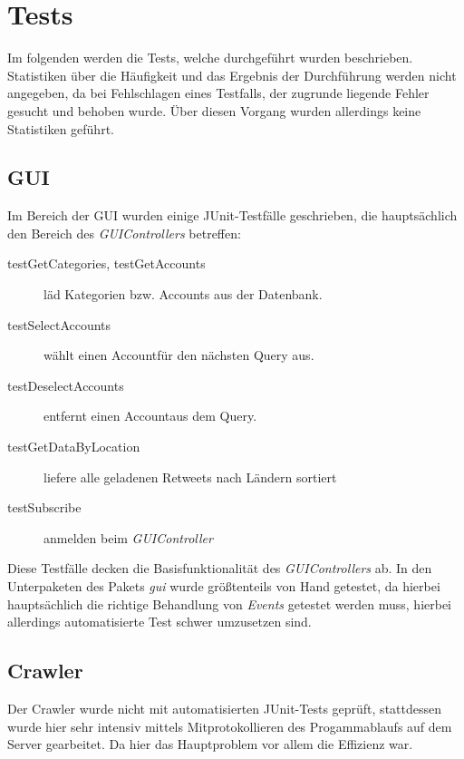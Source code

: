 \section{Tests}

Im folgenden werden die Tests, welche durchgeführt wurden beschrieben. Statistiken über die Häufigkeit und das Ergebnis der Durchführung werden nicht angegeben, da bei Fehlschlagen eines Testfalls, der zugrunde liegende Fehler gesucht und behoben wurde. Über diesen Vorgang wurden allerdings keine Statistiken geführt.

\subsection{GUI}

Im Bereich der GUI wurden einige JUnit-Testfälle geschrieben, die hauptsächlich den Bereich des \emph{GUIControllers} betreffen:
\begin{description}
	\item[testGetCategories, testGetAccounts] läd Kategorien bzw. Accounts aus der Datenbank.
	\item[testSelectAccounts] wählt einen Account\footnotemark[1] für den nächsten Query aus.
	\item[testDeselectAccounts] entfernt einen Account\footnotemark[1] aus dem Query.
	\item[testGetDataByLocation] liefere alle geladenen Retweets nach Ländern sortiert
	\item[testSubscribe] anmelden beim \emph{GUIController}
\end{description}

Diese Testfälle decken die Basisfunktionalität des \emph{GUIControllers} ab. In den Unterpaketen des Pakets \emph{gui} wurde größtenteils von Hand getestet, da  hierbei hauptsächlich die richtige Behandlung von \emph{Events} getestet werden muss, hierbei allerdings automatisierte Test schwer umzusetzen sind.


\subsection{Crawler}

Der Crawler wurde nicht mit automatisierten JUnit-Tests geprüft, stattdessen wurde hier sehr intensiv mittels Mitprotokollieren des Progammablaufs auf dem Server gearbeitet. Da hier das Hauptproblem vor allem die Effizienz war.

